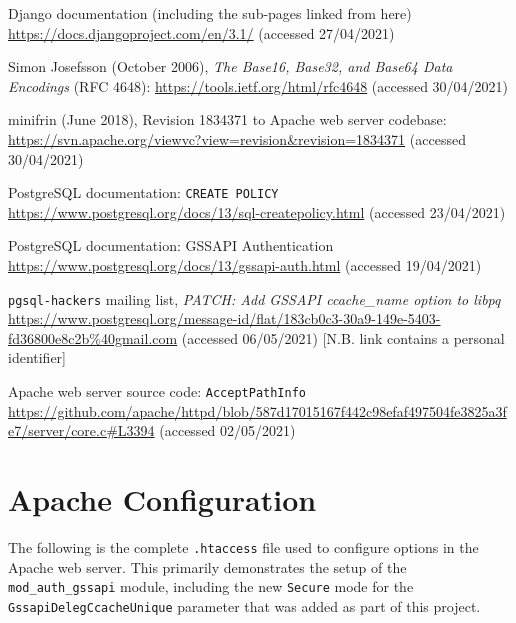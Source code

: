 \documentclass[12pt]{report}
\begin{document}
\begin{thebibliography}{99}
 Django documentation (including the sub-pages linked from here) \url{https://docs.djangoproject.com/en/3.1/} (accessed 27/04/2021)

 Simon Josefsson (October 2006), \textit{The Base16, Base32, and Base64 Data Encodings} (RFC 4648): \url{https://tools.ietf.org/html/rfc4648} (accessed 30/04/2021)

 minifrin (June 2018), Revision 1834371 to Apache web server codebase: \url{https://svn.apache.org/viewvc?view=revision&revision=1834371} (accessed 30/04/2021)

 PostgreSQL documentation: \texttt{CREATE POLICY} \url{https://www.postgresql.org/docs/13/sql-createpolicy.html} (accessed 23/04/2021)

 PostgreSQL documentation: GSSAPI Authentication \url{https://www.postgresql.org/docs/13/gssapi-auth.html} (accessed 19/04/2021)

 \texttt{pgsql-hackers} mailing list, \textit{PATCH: Add GSSAPI ccache\_name option to libpq} \url{https://www.postgresql.org/message-id/flat/183cb0c3-30a9-149e-5403-fd36800e8c2b%40gmail.com} (accessed 06/05/2021) [N.B. link contains a personal identifier]

 Apache web server source code: \texttt{AcceptPathInfo} \url{https://github.com/apache/httpd/blob/587d17015167f442c98efaf497504fe3825a3fe7/server/core.c#L3394} (accessed 02/05/2021)


\end{thebibliography}

\appendix
\chapter{Apache Configuration}
\label{sec:appendix1}
The following is the complete \verb+.htaccess+ file used to configure options in the Apache web server. This primarily demonstrates the setup of the \verb+mod_auth_gssapi+ module, including the new \texttt{Secure} mode for the \texttt{GssapiDelegCcacheUnique} parameter that was added as part of this project.
\end{document}
